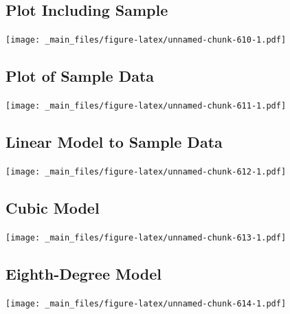\documentclass[]{book}
\newenvironment{Shaded}{\begin{snugshade}}{\end{snugshade}}
\newcommand{\KeywordTok}[1]{\textcolor[rgb]{0.13,0.29,0.53}{\textbf{#1}}}
\newcommand{\DecValTok}[1]{\textcolor[rgb]{0.00,0.00,0.81}{#1}}
\newcommand{\StringTok}[1]{\textcolor[rgb]{0.31,0.60,0.02}{#1}}
\newcommand{\OperatorTok}[1]{\textcolor[rgb]{0.81,0.36,0.00}{\textbf{#1}}}
\newcommand{\NormalTok}[1]{#1}
\begin{document}
\begin{Shaded}
\end{Shaded}

\subsection{Plot Including Sample}\label{plot-including-sample}

\texttt{[image: \_main\_files/figure-latex/unnamed-chunk-610-1.pdf]}

\subsection{Plot of Sample Data}\label{plot-of-sample-data}

\texttt{[image: \_main\_files/figure-latex/unnamed-chunk-611-1.pdf]}

\subsection{Linear Model to Sample
Data}\label{linear-model-to-sample-data}

\texttt{[image: \_main\_files/figure-latex/unnamed-chunk-612-1.pdf]}

\subsection{Cubic Model}\label{cubic-model}

\texttt{[image: \_main\_files/figure-latex/unnamed-chunk-613-1.pdf]}

\subsection{Eighth-Degree Model}\label{eighth-degree-model}

\texttt{[image: \_main\_files/figure-latex/unnamed-chunk-614-1.pdf]}
\end{document}
